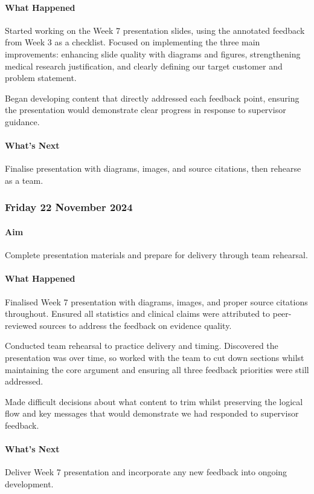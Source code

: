 \paragraph{What Happened}
Started working on the Week 7 presentation slides, using the annotated feedback from Week 3 as a checklist. Focused on implementing the three main improvements: enhancing slide quality with diagrams and figures, strengthening medical research justification, and clearly defining our target customer and problem statement.

Began developing content that directly addressed each feedback point, ensuring the presentation would demonstrate clear progress in response to supervisor guidance.

\paragraph{What's Next}
Finalise presentation with diagrams, images, and source citations, then rehearse as a team.

\subsubsection*{Friday 22 November 2024}

\paragraph{Aim}
Complete presentation materials and prepare for delivery through team rehearsal.

\paragraph{What Happened}
Finalised Week 7 presentation with diagrams, images, and proper source citations throughout. Ensured all statistics and clinical claims were attributed to peer-reviewed sources to address the feedback on evidence quality.

Conducted team rehearsal to practice delivery and timing. Discovered the presentation was over time, so worked with the team to cut down sections whilst maintaining the core argument and ensuring all three feedback priorities were still addressed.

Made difficult decisions about what content to trim whilst preserving the logical flow and key messages that would demonstrate we had responded to supervisor feedback.

\paragraph{What's Next}
Deliver Week 7 presentation and incorporate any new feedback into ongoing development.

